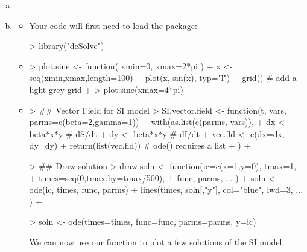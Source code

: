 \documentclass[12pt]{article}
\begin{document}
\begin{enumerate}[(a)]

\item \FitSIRa

\item \FitSIRbIntro
\begin{itemize}
    \item Your code will first need to load the  package:
\begin{Schunk}
\begin{Sinput}
> library("deSolve")
\end{Sinput}
\end{Schunk}
    \item \FitSIRbii
\begin{Schunk}
\begin{Sinput}
> plot.sine <- function( xmin=0, xmax=2*pi ) {
+   x <- seq(xmin,xmax,length=100)
+   plot(x, sin(x), typ="l")
+   grid() # add a light grey grid
+ }
> plot.sine(xmax=4*pi)
\end{Sinput}
\end{Schunk}
  \item \FitSIRbiiiA
\begin{Schunk}
\begin{Sinput}
> ## Vector Field for SI model
> SI.vector.field <- function(t, vars, parms=c(beta=2,gamma=1)) {
+   with(as.list(c(parms, vars)), {
+     dx <- -beta*x*y # dS/dt
+     dy <- beta*x*y  # dI/dt
+     vec.fld <- c(dx=dx, dy=dy)
+     return(list(vec.fld)) # ode() requires a list
+   })
+ }
\end{Sinput}
\end{Schunk}

\FitSIRbiiiB
\begin{Schunk}
\begin{Sinput}
> ## Draw solution
> draw.soln <- function(ic=c(x=1,y=0), tmax=1, 
+                       times=seq(0,tmax,by=tmax/500), 
+                       func, parms, ... ) {
+   soln <- ode(ic, times, func, parms)
+   lines(times, soln[,"y"], col="blue", lwd=3, ... )
+ }
\end{Sinput}
\end{Schunk}
\FitSIRbiiiC
\begin{Schunk}
\begin{Sinput}
>   soln <- ode(times=times, func=func, parms=parms, y=ic)
\end{Sinput}
\end{Schunk}

We can now use our  function to plot a few solutions of the SI model.


\end{itemize}
\end{enumerate}
\end{document}
